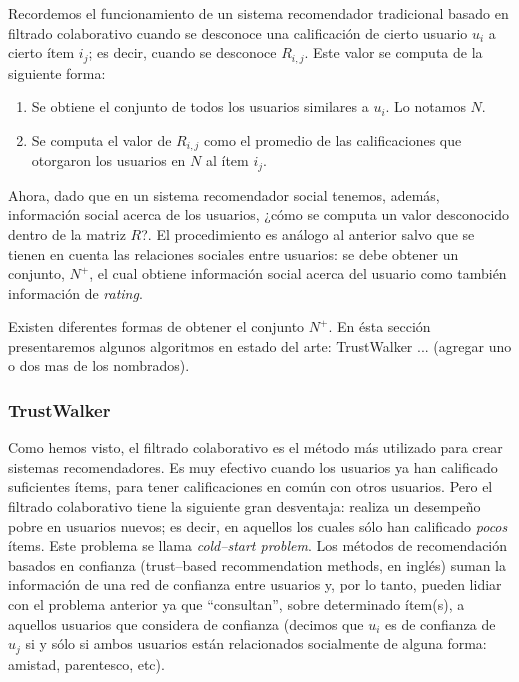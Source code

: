 		Recordemos el funcionamiento de un sistema recomendador tradicional basado en filtrado colaborativo cuando se desconoce una calificación de cierto usuario $u_i$ a cierto ítem $i_j$; es decir, cuando se desconoce $R_{i,j}$. Este valor se computa de la siguiente forma:
		\begin{enumerate}
			\item Se obtiene el conjunto de todos los usuarios similares a $u_i$. Lo notamos $N$.
			\item Se computa el valor de $R_{i,j}$ como el promedio de las calificaciones que otorgaron los usuarios en $N$ al ítem $i_j$.
		\end{enumerate}
		
		Ahora, dado que en un sistema recomendador social tenemos, además, información social acerca de los usuarios, ¿cómo se computa un valor desconocido dentro de la matriz $R$?. El procedimiento es análogo al anterior salvo que se tienen en cuenta las relaciones sociales entre usuarios: se debe obtener un conjunto, $N^+$, el cual obtiene información social acerca del usuario como también información de \textit{rating}. \par
		
		Existen diferentes formas de obtener el conjunto $N^+$. En ésta sección presentaremos algunos algoritmos en estado del arte: TrustWalker \cite{jamali2009}... (agregar uno o dos mas de los nombrados).
		
		\subsubsection{TrustWalker}
			Como hemos visto, el filtrado colaborativo es el método más utilizado para crear sistemas recomendadores. Es muy efectivo cuando los usuarios ya han calificado suficientes ítems, para tener calificaciones en común con otros usuarios. Pero el filtrado colaborativo tiene la siguiente gran desventaja: realiza un desempeño pobre en usuarios nuevos; es decir, en aquellos los cuales sólo han calificado \textit{pocos} ítems. Este problema se llama \textit{cold--start problem}. Los métodos de recomendación basados en confianza (trust--based recommendation methods, en inglés) suman la información de una red de confianza entre usuarios y, por lo tanto, pueden lidiar con el problema anterior ya que \enquote{consultan}, sobre determinado ítem(s), a aquellos usuarios que considera de confianza (decimos que $u_i$ es de confianza de $u_j$ si y sólo si ambos usuarios están relacionados socialmente de alguna forma: amistad, parentesco, etc). \par
			
